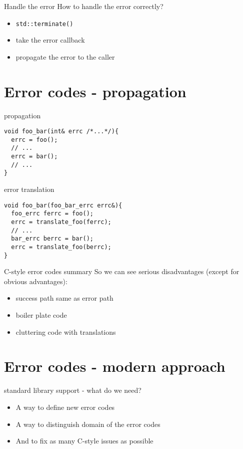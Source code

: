 \documentclass[10pt]{beamer}
\begin{document}
\begin{frame}{Handle the error}
	How to handle the error correctly?
	
	\pause
	
	\begin{itemize}[<+- | alert@+>]
		\item \texttt{std::terminate()}
		\item take the error callback
		\item propagate the error to the caller
	\end{itemize}
	
\end{frame}

\section{Error codes - propagation}

\begin{frame}[fragile]{propagation}
	\begin{verbatim}
void foo_bar(int& errc /*...*/){
  errc = foo();
  // ...
  errc = bar();		
  // ...
}
	\end{verbatim}
	
\end{frame}

\begin{frame}[fragile]{error translation}
	\begin{verbatim}
void foo_bar(foo_bar_errc errc&){
  foo_errc ferrc = foo();
  errc = translate_foo(ferrc);
  // ...
  bar_errc berrc = bar();
  errc = translate_foo(berrc);
}
	\end{verbatim}
\end{frame}

\begin{frame}{C-style error codes summary}
	So we can see {\color{red}serious disadvantages} (except for {\color{blue}obvious advantages}):
	
	\begin{itemize}[<+- | alert@+>]
		\item success path same as error path
		\item boiler plate code
		\item cluttering code with translations
	\end{itemize}
\end{frame}
	

\section{Error codes - modern approach}
\begin{frame}{standard library support - what do we need?}
	\begin{itemize}
		\item A way to define new error codes
		\item A way to distinguish domain of the error codes
		\item And to fix as many C-style issues as possible
	\end{itemize}
\end{frame}
\end{document}

